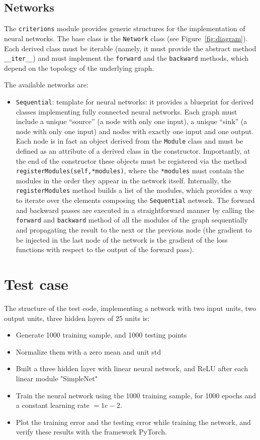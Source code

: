 \documentclass[10pt,final,a4paper]{article}
\begin{document}
\subsection{Networks}
The \verb|criterions| module provides generic structures for the implementation of neural networks. The base class is the \verb|Network| class (see Figure~\ref{fig:diagram}). Each derived class must be iterable (namely, it must provide the abstract method \verb|__iter__|) and must implement the \verb|forward| and the \verb|backward| methods, which depend on the topology of the underlying graph.

The available networks are:
\begin{itemize}
\item \verb|Sequential|: template for neural networks: it provides a blueprint for derived classes implementing fully connected neural networks. Each graph must include a unique ``source'' (a node with only one input), a unique ``sink'' (a node with only one input) and nodes with exactly one input and one output. Each node is in fact an object derived from the \verb|Module| class and must be defined as an attribute of a derived class in the constructor. Importantly, at the end of the constructor these objects must be registered via the method \verb|registerModules(self,*modules)|, where the \verb|*modules| must contain the modules in the order they appear in the network itself. Internally, the \verb|registerModules| method builds a list of the modules, which  provides a way to iterate over the elements composing the \verb|Sequential| network. The forward and backward passes are executed in a straightforward manner by calling the \verb|forward| and \verb|backward| method of all the modules of the graph sequentially and propagating the result to the next or the previous node (the gradient to be injected in the last node of the network is the gradient of the loss functions with respect to the output of the forward pass).
\end{itemize}
\section{Test case}
The structure of the test code, implementing a network with two input units, two output units, three hidden layers of 25 units is:
\begin{itemize}
\item Generate 1000 training sample, and 1000 testing points
\item Normalize them with a zero mean and unit std
\item Built a three hidden layer with linear neural network, and ReLU after each linear module "SimpleNet"
\item Train the neural network using the 1000 training sample, for 1000 epochs and a constant learning rate $=1e-2$.
\item Plot the training error and the testing error while training the network, and verify these results with the framework PyTorch.
\end{itemize}
\end{document}
